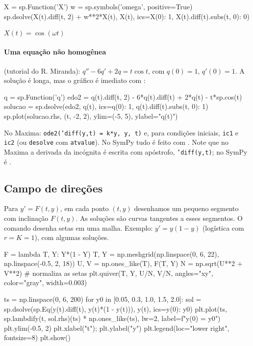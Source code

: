 \begin{entrada}
X = sp.Function('X')
w = sp.symbols('omega', positive=True)
sp.dsolve(X(t).diff(t, 2) + w**2*X(t), X(t), ics={X(0): 1, X(t).diff(t).subs(t, 0): 0})
\end{entrada}
\begin{saidamat}
$\displaystyle X{\left(t \right)} = \cos{\left(\omega t \right)}$
\end{saidamat}

\paragraph{Uma equação não homogênea} (tutorial do R. Miranda): $q''-6q'+2q=t\cos t$, com $q(0)=1$, $q'(0)=1$. A
solução é longa, mas o gráfico é imediato com :

\begin{entrada}
q = sp.Function('q')
edo2 = q(t).diff(t, 2) - 6*q(t).diff(t) + 2*q(t) - t*sp.cos(t)
solucao = sp.dsolve(edo2, q(t), ics={q(0): 1, q(t).diff(t).subs(t, 0): 1})
sp.plot(solucao.rhs, (t, -2, 2), ylim=(-5, 5), ylabel="q(t)")
\end{entrada}

\begin{maxima}
No Maxima: \texttt{ode2('diff(y,t) = k*y, y, t)} e, para condições iniciais, \texttt{ic1} e \texttt{ic2}
(ou \texttt{desolve} com \texttt{atvalue}). No SymPy tudo é feito com . Note que no
Maxima a derivada da incógnita é escrita com apóstrofo, \texttt{'diff(y,t)}; no SymPy é .
\end{maxima}

\subsection{Campo de direções}

Para $y'=F(t,y)$, em cada ponto $(t,y)$ desenhamos um pequeno segmento com inclinação $F(t,y)$. As soluções são
curvas tangentes a esses segmentos. O comando  desenha setas em uma malha. Exemplo:
$y'=y(1-y)$ (logística com $r=K=1$), com algumas soluções.

\begin{entrada}
F = lambda T, Y: Y*(1 - Y)
T, Y = np.meshgrid(np.linspace(0, 6, 22), np.linspace(-0.5, 2, 18))
U, V = np.ones_like(T), F(T, Y)
N = np.sqrt(U**2 + V**2)                      # normaliza as setas
plt.quiver(T, Y, U/N, V/N, angles="xy", color="gray", width=0.003)

ts = np.linspace(0, 6, 200)
for y0 in [0.05, 0.3, 1.0, 1.5, 2.0]:
    sol = sp.dsolve(sp.Eq(y(t).diff(t), y(t)*(1 - y(t))), y(t), ics={y(0): y0})
    plt.plot(ts, sp.lambdify(t, sol.rhs)(ts) * np.ones_like(ts), lw=2, label=f"y(0) = {y0}")
plt.ylim(-0.5, 2)
plt.xlabel("t"); plt.ylabel("y")
plt.legend(loc="lower right", fontsize=8)
plt.show()
\end{entrada}

